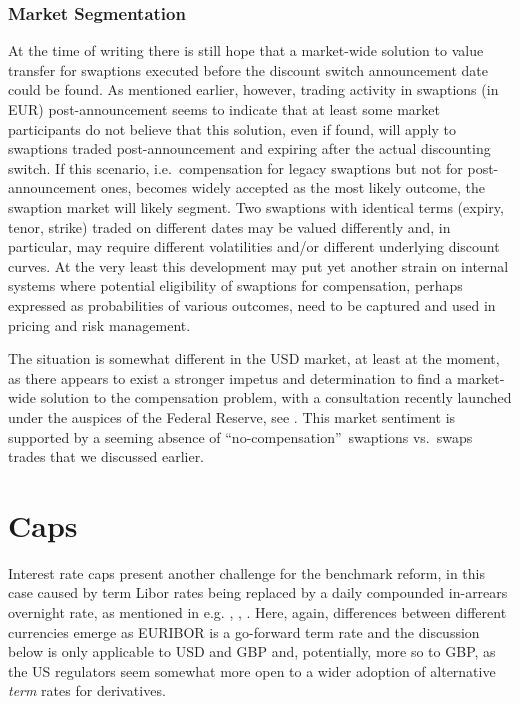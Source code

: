 \documentclass{article}
\begin{document}
\subsubsection{Market Segmentation}

At the time of writing there is still hope that a market-wide solution to
value transfer for swaptions executed before the discount switch
announcement date could be found. As mentioned earlier, however, trading
activity in swaptions (in EUR) post-announcement seems to indicate that at
least some market participants do not believe that this solution, even if
found, will apply to swaptions traded post-announcement and expiring after
the actual discounting switch. If this scenario, i.e.~compensation for
legacy swaptions but not for post-announcement ones, becomes widely accepted
as the most likely outcome, the swaption market will likely segment. Two
swaptions with identical terms (expiry, tenor, strike) traded on different
dates may be valued differently and, in particular, may require different
volatilities and/or different underlying discount curves. At the very least
this development may put yet another strain on internal systems where
potential eligibility of swaptions for compensation, perhaps expressed as
probabilities of various outcomes, need to be captured and used in pricing
and risk management.

The situation is somewhat different in the USD market, at least at the
moment, as there appears to exist a stronger impetus and determination to
find a market-wide solution to the compensation problem, with a consultation
recently launched under the auspices of the Federal Reserve, see \cite{arrc}%
. This market sentiment is supported by a seeming absence of
\textquotedblleft no-compensation\textquotedblright\ swaptions vs.~swaps
trades that we discussed earlier.

\section{Caps}

Interest rate caps present another challenge for the benchmark reform, in
this case caused by term Libor rates being replaced by a daily compounded
in-arrears overnight rate, as mentioned in e.g. \cite{henrard-qse1}, \cite%
{henrard-ssrn1}, \cite{risk-fras}. Here, again, differences between
different currencies emerge as EURIBOR is a go-forward term rate and the
discussion below is only applicable to USD and GBP and, potentially, more so
to GBP, as the US regulators seem somewhat more open to a wider adoption of
alternative \textit{term} rates for derivatives.
\end{document}
